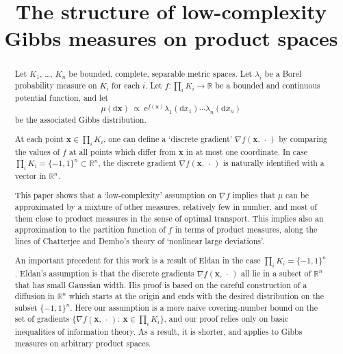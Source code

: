 \documentclass[aop,preprint]{imsart}
\theoremstyle{remark}
\renewcommand{\bf}[1]{\boldsymbol{#1}}
\newcommand{\bbR}{\mathbb{R}}
\renewcommand{\d}{\mathrm{d}}
\newcommand{\rme}{\mathrm{e}}
\renewcommand{\l}{\lambda}
\renewcommand{\to}{\longrightarrow}
\begin{document}
\begin{frontmatter}
	\title{The structure of low-complexity Gibbs measures on product spaces}

		\author{ }
		
		
		
		\address{UCLA Mathematics Department, Box 951555,\\ Los Angeles, CA 90095-1555, U.S.A.\\}

\begin{abstract}
	Let $K_1$, \dots, $K_n$ be bounded, complete, separable metric spaces. Let $\l_i$ be a Borel probability measure on $K_i$ for each $i$. Let $f:\prod_i K_i \to \bbR$ be a bounded and continuous potential function, and let
	\[\mu(\d \bf{x})\ \propto\ \rme^{f(\bf{x})}\l_1(\d x_1)\cdots \l_n(\d x_n)\]
	be the associated Gibbs distribution.
	
	At each point $\bf{x} \in \prod_i K_i$, one can define a `discrete gradient' $\nabla f(\bf{x},\,\cdot\,)$ by comparing the values of $f$ at all points which differ from $\bf{x}$ in at most one coordinate.  In case $\prod_i K_i = \{-1,1\}^n \subset \bbR^n$, the discrete gradient $\nabla f(\bf{x},\,\cdot\,)$ is naturally identified with a vector in $\bbR^n$.

This paper shows that a `low-complexity' assumption on $\nabla f$ implies that $\mu$ can be approximated by a mixture of other measures, relatively few in number, and most of them close to product measures in the sense of optimal transport.  This implies also an approximation to the partition function of $f$ in terms of product measures, along the lines of Chatterjee and Dembo's theory of `nonlinear large deviations'.

An important precedent for this work is a result of Eldan in the case $\prod_i K_i = \{-1,1\}^n$.  Eldan's assumption is that the discrete gradients $\nabla f(\bf{x},\,\cdot\,)$ all lie in a subset of $\bbR^n$ that has small Gaussian width.  His proof is based on the careful construction of a diffusion in $\bbR^n$ which starts at the origin and ends with the desired distribution on the subset $\{-1,1\}^n$.  Here our assumption is a more naive covering-number bound on the set of gradients $\{\nabla f(\bf{x},\,\cdot\,):\ \bf{x} \in \prod_i K_i\}$, and our proof relies only on basic inequalities of information theory.  As a result, it is shorter, and applies to Gibbs measures on arbitrary product spaces.
	\end{abstract}


\end{frontmatter}
\end{document}

